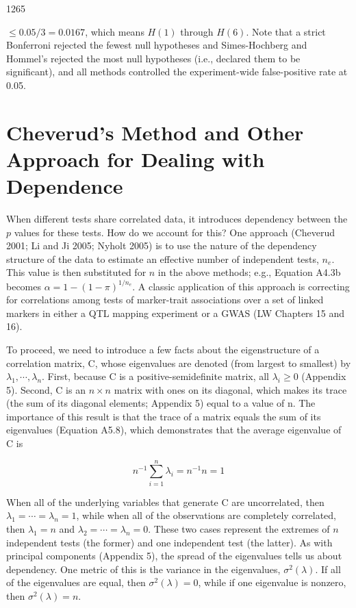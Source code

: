 \documentclass{article}
\begin{document}
1265

 $ \leq 0.05/3 = 0.0167 $, which means  $ H(1) $ through  $ H(6) $. Note that a strict Bonferroni rejected the fewest null hypotheses and Simes-Hochberg and Hommel's rejected the most null hypotheses (i.e., declared them to be significant), and all methods controlled the experiment-wide false-positive rate at 0.05.

\section{Cheverud's Method and Other Approach for Dealing with Dependence}
When different tests share correlated data, it introduces dependency between the $p$ values for these tests. How do we account for this? One approach (Cheverud 2001; Li and Ji 2005; Nyholt 2005) is to use the nature of the dependency structure of the data to estimate an effective number of independent tests, $n_{e}$. This value is then substituted for $n$ in the above methods; e.g., Equation A4.3b becomes $\alpha = 1 - (1 - \pi)^{1/n_{e}}$. A classic application of this approach is correcting for correlations among tests of marker-trait associations over a set of linked markers in either a QTL mapping experiment or a GWAS (LW Chapters 15 and 16).

To proceed, we need to introduce a few facts about the eigenstructure of a correlation matrix, C, whose eigenvalues are denoted (from largest to smallest) by  $ \lambda_1, \cdots, \lambda_n $. First, because C is a positive-semidefinite matrix, all  $ \lambda_i \geq 0 $ (Appendix 5). Second, C is an  $ n \times n $ matrix with ones on its diagonal, which makes its trace (the sum of its diagonal elements; Appendix 5) equal to a value of n. The importance of this result is that the trace of a matrix equals the sum of its eigenvalues (Equation A5.8), which demonstrates that the average eigenvalue of C is

\begin{equation}
n^{-1}\sum_{i=1}^{n}\lambda_{i}=n^{-1}n=1
\end{equation}

When all of the underlying variables that generate C are uncorrelated, then  $ \lambda_1 = \cdots = \lambda_n = 1 $, while when all of the observations are completely correlated, then  $ \lambda_1 = n $ and  $ \lambda_2 = \cdots = \lambda_n = 0 $. These two cases represent the extremes of  $ n $ independent tests (the former) and one independent test (the latter). As with principal components (Appendix 5), the spread of the eigenvalues tells us about dependency. One metric of this is the variance in the eigenvalues,  $ \sigma^2(\lambda) $. If all of the eigenvalues are equal, then  $ \sigma^2(\lambda) = 0 $, while if one eigenvalue is nonzero, then  $ \sigma^2(\lambda) = n $.
\end{document}
